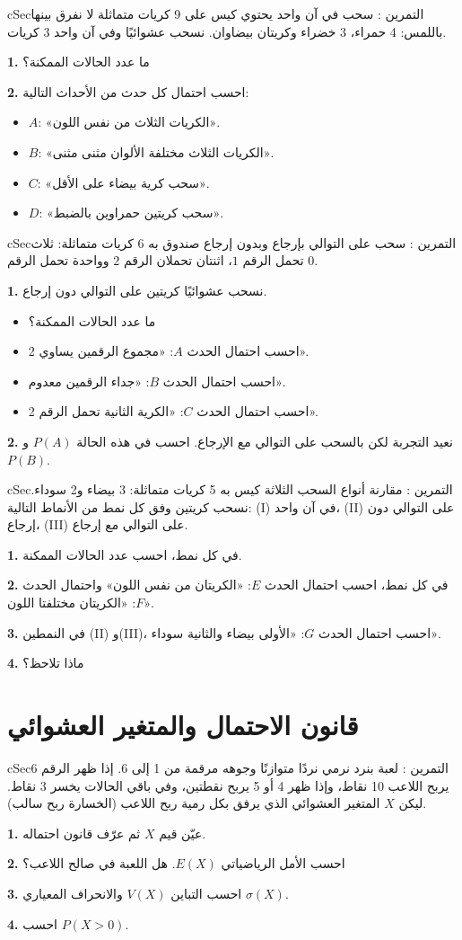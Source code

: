 \documentclass[12pt,a4paper]{article}
\newenvironment{BOX}[2]{\begin{otherlanguage}{english}\begin{arbox}{#1}{#2}}{\end{arbox}\end{otherlanguage}}
\newcounter{exo}
\newenvironment{tamrin}[1]{\stepcounter{exo}\begin{BOX}{cSec}{التمرين \theexo: #1}}{\end{BOX}}
\newenvironment{sq}{\begin{itemize}[leftmargin=2.4em,itemsep=3pt]}{\end{itemize}}
\newcommand{\qa}{\item[(أ)]}\newcommand{\qb}{\item[(ب)]}\newcommand{\qc}{\item[(جـ)]}\newcommand{\qd}{\item[(د)]}\newcommand{\qe}{\item[(هـ)]}
\newcommand{\QQ}[1]{\par\smallskip\textbf{#1.} }
\begin{document}
\begin{tamrin}{سحب في آن واحد}
يحتوي كيس على 9 كريات متماثلة لا نفرق بينها باللمس: 4 حمراء، 3 خضراء وكريتان بيضاوان. نسحب عشوائيًا وفي آن واحد 3 كريات.
\QQ{1} ما عدد الحالات الممكنة؟
\QQ{2} احسب احتمال كل حدث من الأحداث التالية:
\begin{sq}
\qa $A$: «الكريات الثلاث من نفس اللون».
\qb $B$: «الكريات الثلاث مختلفة الألوان مثنى مثنى».
\qc $C$: «سحب كرية بيضاء على الأقل».
\qd $D$: «سحب كريتين حمراوين بالضبط».
\end{sq}
\end{tamrin}

\begin{tamrin}{سحب على التوالي بإرجاع وبدون إرجاع}
صندوق به 6 كريات متماثلة: ثلاث تحمل الرقم $1$، اثنتان تحملان الرقم $2$ وواحدة تحمل الرقم $0$.
\QQ{1} نسحب عشوائيًا كريتين على التوالي دون إرجاع.
\begin{sq}
\qa ما عدد الحالات الممكنة؟
\qb احسب احتمال الحدث $A$: «مجموع الرقمين يساوي 2».
\qc احسب احتمال الحدث $B$: «جداء الرقمين معدوم».
\qd احسب احتمال الحدث $C$: «الكرية الثانية تحمل الرقم 2».
\end{sq}
\QQ{2} نعيد التجربة لكن بالسحب على التوالي مع الإرجاع. احسب في هذه الحالة $P(A)$ و$P(B)$.
\end{tamrin}

\begin{tamrin}{مقارنة أنواع السحب الثلاثة}
كيس به 5 كريات متماثلة: 3 بيضاء و2 سوداء. نسحب كريتين وفق كل نمط من الأنماط التالية:
(I) في آن واحد، (II) على التوالي دون إرجاع، (III) على التوالي مع إرجاع.
\QQ{1} في كل نمط، احسب عدد الحالات الممكنة.
\QQ{2} في كل نمط، احسب احتمال الحدث $E$: «الكريتان من نفس اللون» واحتمال الحدث $F$: «الكريتان مختلفتا اللون».
\QQ{3} في النمطين (II) و(III)، احسب احتمال الحدث $G$: «الأولى بيضاء والثانية سوداء».
\QQ{4} ماذا تلاحظ؟
\end{tamrin}

\section{قانون الاحتمال والمتغير العشوائي}

\begin{tamrin}{لعبة بنرد}
نرمي نردًا متوازنًا وجوهه مرقمة من 1 إلى 6. إذا ظهر الرقم 6 يربح اللاعب 10 نقاط، وإذا ظهر 4 أو 5 يربح نقطتين، وفي باقي الحالات يخسر 3 نقاط. ليكن $X$ المتغير العشوائي الذي يرفق بكل رمية ربح اللاعب (الخسارة ربح سالب).
\QQ{1} عيّن قيم $X$ ثم عرّف قانون احتماله.
\QQ{2} احسب الأمل الرياضياتي $E(X)$. هل اللعبة في صالح اللاعب؟
\QQ{3} احسب التباين $V(X)$ والانحراف المعياري $\sigma(X)$.
\QQ{4} احسب $P(X>0)$.
\end{tamrin}
\end{document}
